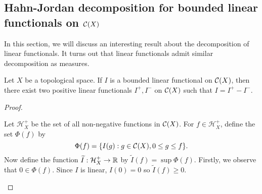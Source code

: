 \subsection{Hahn-Jordan decomposition for bounded linear functionals on ${\mathcal C}(X)$}
In this section, we will discuss an interesting result about the decomposition of linear functionals.
It turns out that linear functionals admit similar decomposition as measures.
\begin{theorem}
\label{thm:funct:hahn-jordan-cx}
Let $X$ be a topological space. If $I$ is a bounded linear functional on ${\mathcal C}(X)$, then there exist two positive linear functionals $I^+, I^-$ on ${\mathcal C}(X)$ such that $I = I^+ - I^-$.
\end{theorem}
\begin{proof}
\setcounter{step}{0}
\begin{step}

Let $\mathcal{H}_{X}^+$ be the set of all non-negative functions in ${\mathcal C}(X)$. For $f \in \mathcal{H}_{X}^+$, define the set $\Phi(f)$ by
\begin{equation*}
    \Phi(f) = \{ I(g) : g \in {\mathcal C}(X), 0 \leq g \leq f \}.
\end{equation*}
Now define the function $\widetilde{I} : \mathcal{H}_{X}^+ \to {\mathbb R}$ by $\widetilde{I}(f) = \sup \Phi(f)$.
Firstly, we observe that $0 \in \Phi(f)$. Since $I$ is linear, $I(0) = 0$ so $\widetilde{I}(f) \geq 0$.


\end{step}
\end{proof}
